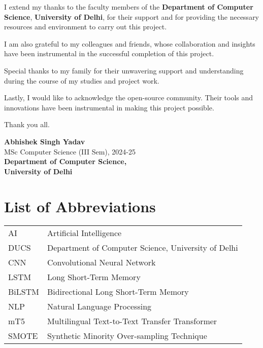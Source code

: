 \documentclass[12pt,a4paper]{report}
\begin{document}
I extend my thanks to the faculty members of the \textbf{Department of Computer Science}, \textbf{University of Delhi}, for their support and for providing the necessary resources and environment to carry out this project.

I am also grateful to my colleagues and friends, whose collaboration and insights have been instrumental in the successful completion of this project.

Special thanks to my family for their unwavering support and understanding during the course of my studies and project work.

Lastly, I would like to acknowledge the open-source community. Their tools and innovations have been instrumental in making this project possible.

\vspace{1cm}

Thank you all.

\vspace{2cm}

\begin{flushright}
    \textbf{Abhishek Singh Yadav} \\ %
    MSc Computer Science (III Sem), 2024-25 \\
    \textbf{Department of Computer Science,} \\ %
    \textbf{University of Delhi}
\end{flushright}


\tableofcontents
\listoffigures

\chapter*{List of Abbreviations}
\begin{tabular}{ll}
AI   & Artificial Intelligence \\
DUCS & Department of Computer Science, University of Delhi \\
CNN & Convolutional Neural Network \\
LSTM & Long Short-Term Memory \\
BiLSTM & Bidirectional Long Short-Term Memory \\
NLP & Natural Language Processing \\
mT5 & Multilingual Text-to-Text Transfer Transformer \\
SMOTE & Synthetic Minority Over-sampling Technique \\
\end{tabular}
\end{document}
